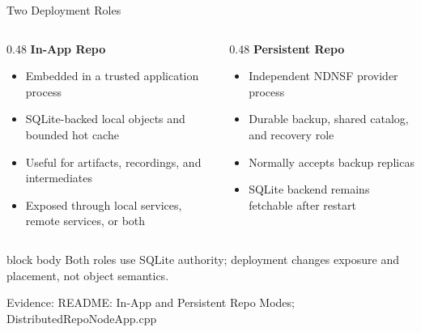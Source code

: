 \documentclass[aspectratio=169]{beamer}
\newcommand{\bluebox}[1]{%
  \begin{beamercolorbox}[rounded=true,shadow=false,sep=0.65em,wd=\linewidth]{block body}
  #1
  \end{beamercolorbox}
}
\newcommand{\evidence}[1]{%
  \vfill\par\noindent
  {\color{SoftGray}\tiny Evidence: #1}\par
}
\begin{document}
\begin{frame}{Two Deployment Roles}
\footnotesize
\begin{columns}[T]
\begin{column}{0.48\textwidth}
\textbf{In-App Repo}
\begin{itemize}
  \item Embedded in a trusted application process
  \item SQLite-backed local objects and bounded hot cache
  \item Useful for artifacts, recordings, and intermediates
  \item Exposed through local services, remote services, or both
\end{itemize}

\vspace{0.25em}
\end{column}
\begin{column}{0.48\textwidth}
\textbf{Persistent Repo}
\begin{itemize}
  \item Independent NDNSF provider process
  \item Durable backup, shared catalog, and recovery role
  \item Normally accepts backup replicas
  \item SQLite backend remains fetchable after restart
\end{itemize}

\vspace{0.25em}
\end{column}
\end{columns}

\vspace{0.1em}
\bluebox{Both roles use SQLite authority; deployment changes exposure and placement, not object semantics.}
\evidence{README: In-App and Persistent Repo Modes; DistributedRepoNodeApp.cpp}
\end{frame}
\end{document}
